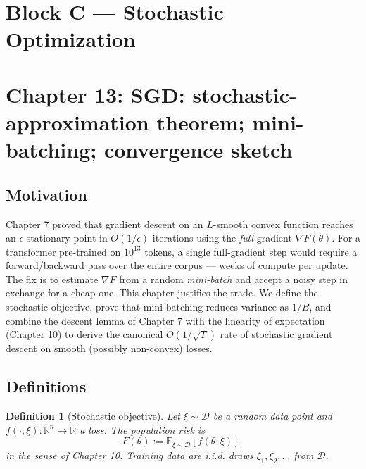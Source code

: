 \documentclass[11pt]{article}
\newtheorem{definition}[theorem]{Definition}
\theoremstyle{remark}
\begin{document}


\section*{Block C --- Stochastic Optimization}

\section*{Chapter 13: SGD: stochastic-approximation theorem; mini-batching; convergence sketch}

\subsection*{Motivation}

Chapter 7 proved that gradient descent on an $L$-smooth convex function reaches an $\epsilon$-stationary point in $O(1/\epsilon)$ iterations using the \emph{full} gradient $\nabla F(\theta)$. For a transformer pre-trained on $10^{13}$ tokens, a single full-gradient step would require a forward/backward pass over the entire corpus --- weeks of compute per update. The fix is to estimate $\nabla F$ from a random \emph{mini-batch} and accept a noisy step in exchange for a cheap one. This chapter justifies the trade. We define the stochastic objective, prove that mini-batching reduces variance as $1/B$, and combine the descent lemma of Chapter 7 with the linearity of expectation (Chapter 10) to derive the canonical $O(1/\sqrt{T})$ rate of stochastic gradient descent on smooth (possibly non-convex) losses.

\subsection*{Definitions}

\begin{definition}[Stochastic objective]
Let $\xi \sim \mathcal{D}$ be a random data point and $f(\cdot; \xi) : \mathbb{R}^n \to \mathbb{R}$ a loss. The \emph{population risk} is
\[
F(\theta) := \mathbb{E}_{\xi \sim \mathcal{D}}[f(\theta; \xi)],
\]
in the sense of Chapter 10. Training data are i.i.d. draws $\xi_1, \xi_2, \dots$ from $\mathcal{D}$.
\end{definition}
\end{document}
